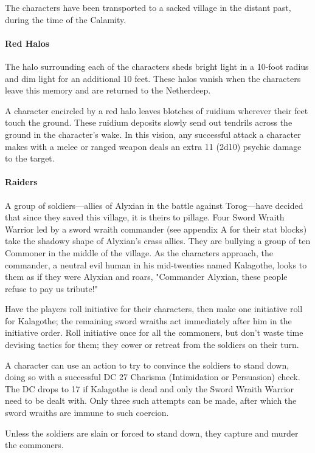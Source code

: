\documentclass[10pt,a4paper,twoside,twocolumn,openany,nodeprecatedcode]{dndbook}
\begin{document}
The characters have been transported to a sacked village in the distant past, during the time of the Calamity.

\paragraph{Red Halos}
The halo surrounding each of the characters sheds bright light in a 10-foot radius and dim light for an additional 10 feet. These halos vanish when the characters leave this memory and are returned to the Netherdeep.

A character encircled by a red halo leaves blotches of ruidium wherever their feet touch the ground. These ruidium deposits slowly send out tendrils across the ground in the character's wake. In this vision, any successful attack a character makes with a melee or ranged weapon deals an extra 11 (2d10) psychic damage to the target.

\paragraph{Raiders}
A group of soldiers—allies of Alyxian in the battle against Torog—have decided that since they saved this village, it is theirs to pillage. Four Sword Wraith Warrior led by a sword wraith commander (see appendix A for their stat blocks) take the shadowy shape of Alyxian's crass allies. They are bullying a group of ten Commoner in the middle of the village. As the characters approach, the commander, a neutral evil human in his mid-twenties named Kalagothe, looks to them as if they were Alyxian and roars, "Commander Alyxian, these people refuse to pay us tribute!"

Have the players roll initiative for their characters, then make one initiative roll for Kalagothe; the remaining sword wraiths act immediately after him in the initiative order. Roll initiative once for all the commoners, but don't waste time devising tactics for them; they cower or retreat from the soldiers on their turn.

A character can use an action to try to convince the soldiers to stand down, doing so with a successful DC 27 Charisma (Intimidation or Persuasion) check. The DC drops to 17 if Kalagothe is dead and only the Sword Wraith Warrior need to be dealt with. Only three such attempts can be made, after which the sword wraiths are immune to such coercion.

Unless the soldiers are slain or forced to stand down, they capture and murder the commoners.
\end{document}
